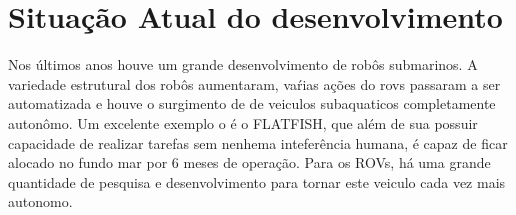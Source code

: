 \section{Situação Atual do desenvolvimento}

Nos últimos anos houve um grande desenvolvimento de robôs submarinos.  A variedade estrutural dos robôs aumentaram, vaŕias ações do rovs passaram a ser automatizada e houve o surgimento de de veiculos subaquaticos completamente autonômo. Um excelente exemplo o é o FLATFISH, que além de sua possuir capacidade de realizar tarefas sem nenhema inteferência humana, é capaz de ficar alocado no fundo mar por 6 meses de operação.
Para os ROVs, há uma grande quantidade de pesquisa  e desenvolvimento para tornar este veiculo cada vez mais autonomo.









